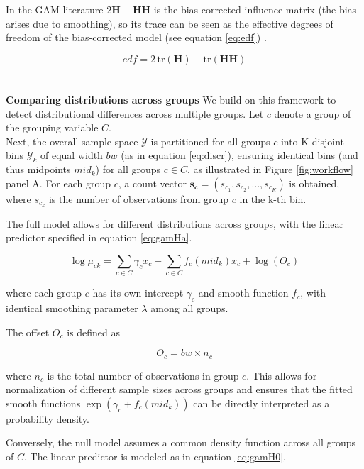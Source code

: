 In the GAM literature $2\boldsymbol{H} - \boldsymbol{H}\boldsymbol{H}$ is the bias-corrected influence matrix (the bias arises due to smoothing), so its trace can be seen as the effective degrees of freedom of the bias-corrected model (see equation \ref{eq:edf}) \cite{gambook_gamtheory_edf}.

\begin{equation}
    edf = 2\,\mathrm{tr}(\boldsymbol{H}) - \mathrm{tr}(\boldsymbol{H}\boldsymbol{H})
    \label{eq:edf}
\end{equation}
\\
\\
\textbf{Comparing distributions across groups} We build on this framework to detect distributional differences across multiple groups. Let $c$ denote a group of the grouping variable $C$.\\
Next, the overall sample space $\mathscr{Y}$ is partitioned for all groups $c$ into K disjoint bins $\mathscr{Y}_k$ of equal width $bw$ (as in equation \ref{eq:discr}), ensuring identical bins (and thus midpoints $mid_k$) for all groups $c \in C$, as illustrated in Figure \ref{fig:workflow} panel A. For each group $c$, a count vector $\boldsymbol{s_c} = (s_{c_1}, s_{c_2},...,s_{c_K})$ is obtained, where $s_{c_k}$ is the number of observations from group $c$ in the k-th bin.

The full model allows for different distributions across groups, with the linear predictor specified in equation \ref{eq:gamHa}.

\begin{equation}
    \log \mu_{ck} = \sum_{c \in C}\gamma_cx_c + \sum_{c \in C} f_c(mid_k)x_c + \log(O_c)
    \label{eq:gamHa}
\end{equation}

where each group $c$ has its own intercept $\gamma_c$ and smooth function $f_c$, with identical smoothing parameter $\lambda$ among all groups.

The offset $O_c$ is defined as

\begin{equation}
    O_c = bw \times n_c
    \label{eq:offset}
\end{equation}

where $n_c$ is the total number of observations in group $c$. This allows for normalization of different sample sizes across groups and ensures that the fitted smooth functions $\exp(\gamma_c + f_c(mid_k))$ can be directly interpreted as a probability density.

Conversely, the null model assumes a common density function across all groups of $C$. The linear predictor is modeled as in equation \ref{eq:gamH0}.


